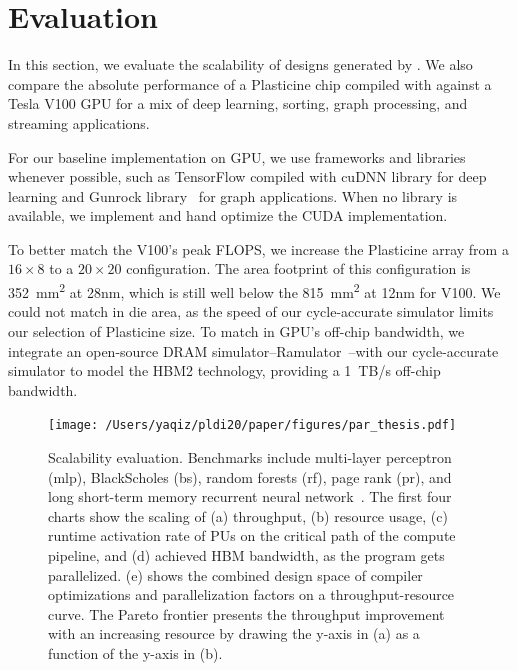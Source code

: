 \section{Evaluation} \label{sec:eval}

In this section, we evaluate the scalability of designs generated by \name.
We also compare the absolute performance of a Plasticine chip compiled with \name against a Tesla V100 GPU 
for a mix of deep learning, sorting, graph processing, and streaming applications.

For our baseline implementation on GPU, we use frameworks and libraries whenever possible, such as TensorFlow compiled
with cuDNN library for deep learning and Gunrock library~\cite{gunrock} for graph applications.
When no library is available, we implement and hand optimize the CUDA implementation.

To better match the V100's peak FLOPS, 
we increase the Plasticine array from a $16\times8$ to a $20\times20$ configuration.
The area footprint of this configuration is \SI{352}{mm^2} at 28nm, which is still well below the 
\SI{815}{mm^2} at 12nm for V100.
We could not match in die area, as the speed of our cycle-accurate simulator limits our selection of Plasticine size.
To match in GPU's off-chip bandwidth, 
we integrate an open-source DRAM simulator--Ramulator~\cite{ramulator}--with our
cycle-accurate simulator to model the HBM2 technology, providing a \SI{1}{TB/s} off-chip bandwidth.

\begin{figure}
\centering
\texttt{[image: /Users/yaqiz/pldi20/paper/figures/par\_thesis.pdf]}
\caption[Scalability evaluation]{
  Scalability evaluation. 
  Benchmarks include multi-layer perceptron (mlp), BlackScholes (bs), random forests (rf), page rank
  (pr), and long short-term memory recurrent neural network~\cite{hochreiter1997long}.
  The first four charts show the scaling of
  (a) throughput, 
  (b) resource usage, 
  (c) runtime activation rate of PUs on the critical path of the compute pipeline, 
  and (d) achieved HBM bandwidth, as the program gets parallelized.
  (e) shows the combined design space of compiler optimizations and parallelization factors on a
  throughput-resource curve. 
  The Pareto frontier presents the throughput improvement with an increasing resource by drawing the y-axis in (a) as a function of the y-axis in (b).
}
\label{fig:par}
\end{figure}

